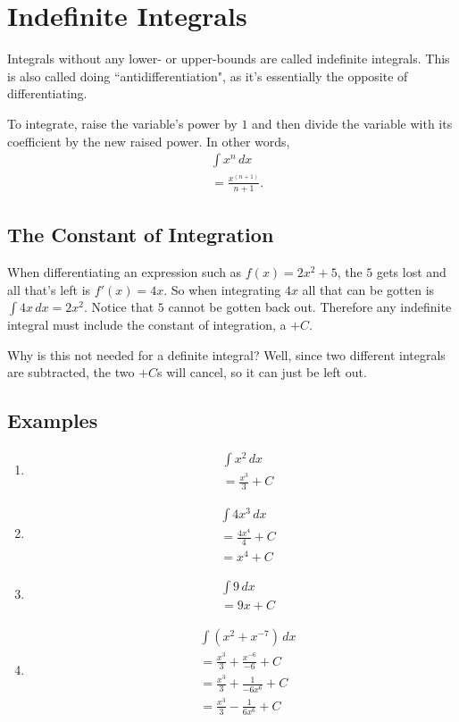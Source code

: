 \section{Indefinite Integrals}
Integrals without any lower- or upper-bounds are called indefinite integrals. This is also called doing ``antidifferentiation", as it's essentially the opposite of differentiating.

To integrate, raise the variable's power by $1$ and then divide the variable with its coefficient by the new raised power. In other words,
\begin{align}
	&\int x^n \, dx\\
	&= \frac{x^{(n+1)}}{n+1}\text{.}
\end{align}

\subsection{The Constant of Integration}
When differentiating an expression such as $f(x) = 2x^2+5$, the $5$ gets lost and all that's left is $f'(x) = 4x$. So when integrating $4x$ all that can be gotten is $\int 4x \, dx = 2x^2$. Notice that $5$ cannot be gotten back out. Therefore any indefinite integral must include the constant of integration, a $+C$.

Why is this not needed for a definite integral? Well, since two different integrals are subtracted, the two $+C$s will cancel, so it can just be left out.

\subsection{Examples}
\begin{enumerate}
	\item
	\begin{align*}
		&\int x^2 \, dx\\
		&= \frac{x^3}{3} + C
	\end{align*}
	
	\item
	\begin{align*}
		&\int 4x^3 \, dx\\
		&= \frac{4x^4}{4} + C\\
		&= x^4+C
	\end{align*}
	
	\item
	\begin{align*}
		&\int 9 \, dx\\
		&= 9x + C
	\end{align*}
	
	\item
	\begin{align*}
		&\int \left(x^2+x^{-7}\right) \, dx\\
		&= \frac{x^3}{3} + \frac{x^{-6}}{-6} + C\\
		&= \frac{x^3}{3} + \frac{1}{-6x^6} + C\\
		&= \frac{x^3}{3} - \frac{1}{6x^6} + C
	\end{align*}
\end{enumerate}

